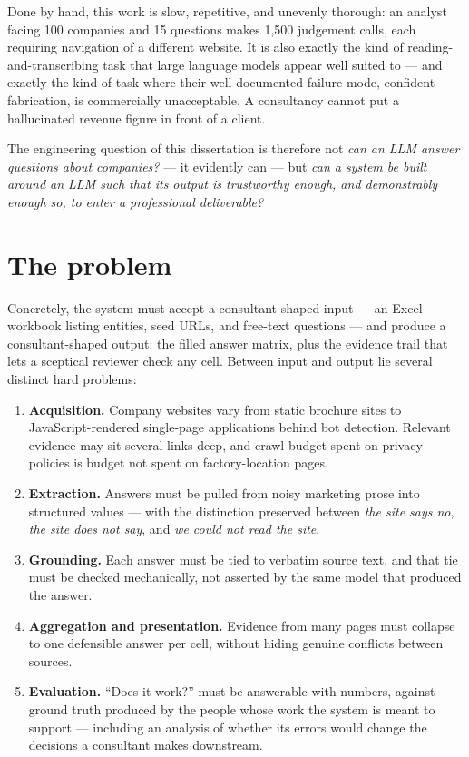 \documentclass[11pt,a4paper]{report}
\begin{document}
Done by hand, this work is slow, repetitive, and unevenly thorough: an
analyst facing 100 companies and 15 questions makes 1,500 judgement calls,
each requiring navigation of a different website. It is also exactly the kind
of reading-and-transcribing task that large language models appear well
suited to --- and exactly the kind of task where their well-documented failure
mode, confident fabrication, is commercially unacceptable. A consultancy
cannot put a hallucinated revenue figure in front of a client.

The engineering question of this dissertation is therefore not \emph{can an
LLM answer questions about companies?} --- it evidently can --- but \emph{can a
system be built around an LLM such that its output is trustworthy enough,
and demonstrably enough so, to enter a professional deliverable?}

\section{The problem}

Concretely, the system must accept a consultant-shaped input --- an Excel
workbook listing entities, seed URLs, and free-text questions --- and produce
a consultant-shaped output: the filled answer matrix, plus the evidence
trail that lets a sceptical reviewer check any cell. Between input and
output lie several distinct hard problems:

\begin{enumerate}
  \item \textbf{Acquisition.} Company websites vary from static brochure
    sites to JavaScript-rendered single-page applications behind bot
    detection. Relevant evidence may sit several links deep, and crawl
    budget spent on privacy policies is budget not spent on factory-location
    pages.
  \item \textbf{Extraction.} Answers must be pulled from noisy marketing
    prose into structured values --- with the distinction preserved between
    \emph{the site says no}, \emph{the site does not say}, and \emph{we
    could not read the site}.
  \item \textbf{Grounding.} Each answer must be tied to verbatim source
    text, and that tie must be checked mechanically, not asserted by the
    same model that produced the answer.
  \item \textbf{Aggregation and presentation.} Evidence from many pages must
    collapse to one defensible answer per cell, without hiding genuine
    conflicts between sources.
  \item \textbf{Evaluation.} ``Does it work?'' must be answerable with
    numbers, against ground truth produced by the people whose work the
    system is meant to support --- including an analysis of whether its
    errors would change the decisions a consultant makes downstream.
\end{enumerate}
\end{document}
